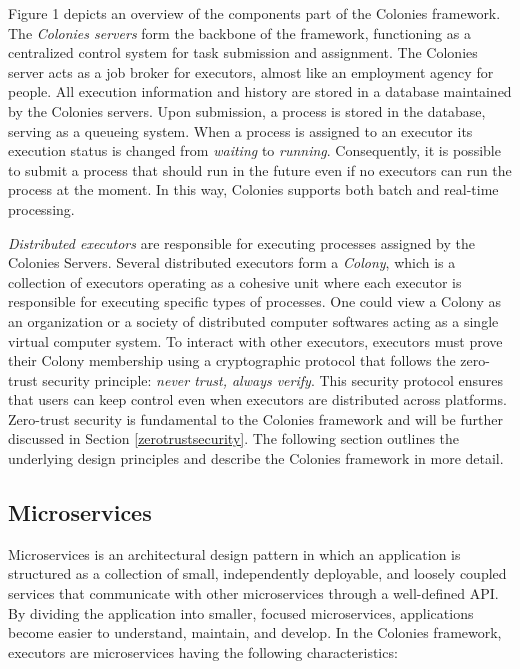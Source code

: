 \documentclass{article}
\begin{document}
Figure 1 depicts an overview of the components part of the Colonies framework. The \emph{Colonies servers} form the backbone of the framework, functioning as a centralized control system for task submission and assignment. The Colonies server acts as a job broker for executors, almost like an employment agency for people. All execution information and history are stored in a database maintained by the Colonies servers. Upon submission, a process is stored in the database, serving as a queueing system. When a process is assigned to an executor its execution status is changed from \emph{waiting} to \emph{running}. Consequently, it is possible to submit a process that should run in the future even if no executors can run the process at the moment. In this way, Colonies supports both batch and real-time processing. 

\emph{Distributed executors} are responsible for executing processes assigned by the Colonies Servers. Several distributed executors form a \emph{Colony}, which is a collection of executors operating as a cohesive unit where each executor is responsible for executing specific types of processes. One could view a Colony as an organization or a society of distributed computer softwares acting as a single virtual computer system. To interact with other executors, executors must prove their Colony membership using a cryptographic protocol that follows the zero-trust security principle: \emph{never trust, always verify}. This security protocol ensures that users can keep control even when executors are distributed across platforms. Zero-trust security is fundamental to the Colonies framework and will be further discussed in Section \ref{zerotrustsecurity}. The following section outlines the underlying design principles and describe the Colonies framework in more detail. 

\subsection{Microservices}
Microservices \cite{microservices} is an architectural design pattern in which an application is structured as a collection of small, independently deployable, and loosely coupled services that communicate with other microservices through a well-defined API. By dividing the application into smaller, focused microservices, applications become easier to understand, maintain, and develop. In the Colonies framework, executors are microservices having the following characteristics:
\end{document}
